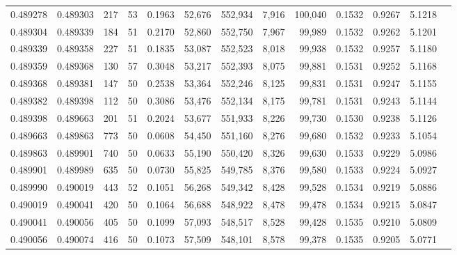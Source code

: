 \begin{tabular}{rrrrrrrrrrrrr}
0.489278 & 0.489303 & 217 &  53 &                                     0.1963 &  52,676 & 552,934 &   7,916 & 100,040 & 0.1532 & 0.9267 & 5.1218 \\
0.489304 & 0.489339 & 184 &  51 &                                     0.2170 &  52,860 & 552,750 &   7,967 &  99,989 & 0.1532 & 0.9262 & 5.1201 \\
0.489339 & 0.489358 & 227 &  51 &                                     0.1835 &  53,087 & 552,523 &   8,018 &  99,938 & 0.1532 & 0.9257 & 5.1180 \\
0.489359 & 0.489368 & 130 &  57 &                                     0.3048 &  53,217 & 552,393 &   8,075 &  99,881 & 0.1531 & 0.9252 & 5.1168 \\
0.489368 & 0.489381 & 147 &  50 &                                     0.2538 &  53,364 & 552,246 &   8,125 &  99,831 & 0.1531 & 0.9247 & 5.1155 \\
0.489382 & 0.489398 & 112 &  50 &                                     0.3086 &  53,476 & 552,134 &   8,175 &  99,781 & 0.1531 & 0.9243 & 5.1144 \\
0.489398 & 0.489663 & 201 &  51 &                                     0.2024 &  53,677 & 551,933 &   8,226 &  99,730 & 0.1530 & 0.9238 & 5.1126 \\
0.489663 & 0.489863 & 773 &  50 &                                     0.0608 &  54,450 & 551,160 &   8,276 &  99,680 & 0.1532 & 0.9233 & 5.1054 \\
0.489863 & 0.489901 & 740 &  50 &                                     0.0633 &  55,190 & 550,420 &   8,326 &  99,630 & 0.1533 & 0.9229 & 5.0986 \\
0.489901 & 0.489989 & 635 &  50 &                                     0.0730 &  55,825 & 549,785 &   8,376 &  99,580 & 0.1533 & 0.9224 & 5.0927 \\
0.489990 & 0.490019 & 443 &  52 &                                     0.1051 &  56,268 & 549,342 &   8,428 &  99,528 & 0.1534 & 0.9219 & 5.0886 \\
0.490019 & 0.490041 & 420 &  50 &                                     0.1064 &  56,688 & 548,922 &   8,478 &  99,478 & 0.1534 & 0.9215 & 5.0847 \\
0.490041 & 0.490056 & 405 &  50 &                                     0.1099 &  57,093 & 548,517 &   8,528 &  99,428 & 0.1535 & 0.9210 & 5.0809 \\
0.490056 & 0.490074 & 416 &  50 &                                     0.1073 &  57,509 & 548,101 &   8,578 &  99,378 & 0.1535 & 0.9205 & 5.0771 \\

\end{tabular}
